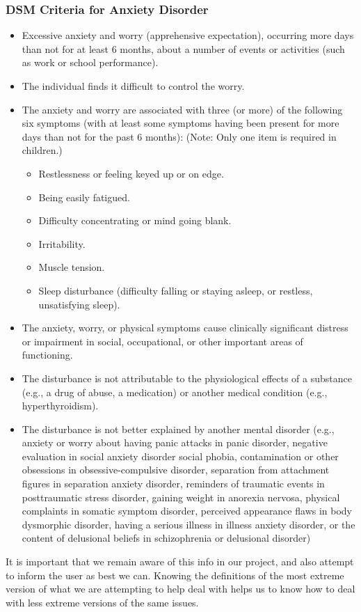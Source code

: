 \documentclass[a4paper,10pt]{article}
\begin{document}
\subsubsection{DSM Criteria for Anxiety Disorder}
\begin{itemize}
	\item Excessive anxiety and worry (apprehensive expectation), occurring more days than not for at least 6 months, about a number of events or activities (such as work or school performance).
	\item The individual finds it difficult to control the worry.
	\item The anxiety and worry are associated with three (or more) of the following six symptoms (with at least some symptoms having been present for more days than not for the past 6 months): (Note: Only one item is required in children.)
	\begin{itemize}
		\item Restlessness or feeling keyed up or on edge.
		\item Being easily fatigued.
		\item Difficulty concentrating or mind going blank.
		\item Irritability.
		\item Muscle tension.
		\item Sleep disturbance (difficulty falling or staying asleep, or restless, unsatisfying sleep).
	\end{itemize}
	
	\item The anxiety, worry, or physical symptoms cause clinically significant distress or impairment in social, occupational, or other important areas of functioning.
	\item The disturbance is not attributable to the physiological effects of a substance (e.g., a drug of abuse, a medication) or another medical condition (e.g., hyperthyroidism).
	\item The disturbance is not better explained by another mental disorder (e.g., anxiety or worry about having panic attacks in panic disorder, negative evaluation in social anxiety disorder social phobia, contamination or other obsessions in obsessive-compulsive disorder, separation from attachment figures in separation anxiety disorder, reminders of traumatic events in posttraumatic stress disorder, gaining weight in anorexia nervosa, physical complaints in somatic symptom disorder, perceived appearance flaws in body dysmorphic disorder, having a serious illness in illness anxiety disorder, or the content of delusional beliefs in schizophrenia or delusional disorder)\cite{dsmAnxiety}
\end{itemize}
It is important that we remain aware of this info in our project, and also attempt to inform the user as best we can.  Knowing the definitions of the most extreme version of what we are attempting to help deal with helps us to know how to deal with less extreme versions of the same issues.
\par~\\ 
\end{document}
